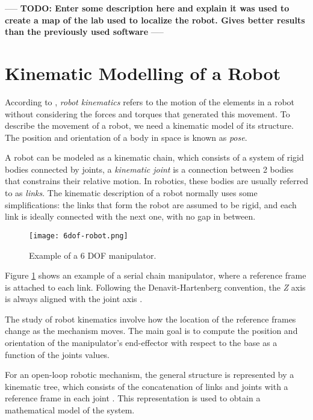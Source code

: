 ----- \textbf{TODO: Enter some description here and explain it was used to create a map of the lab used to localize the robot. Gives better results than the previously used software} -----

\section{Kinematic Modelling of a Robot}

According to \citet{Handbook}, \textit{robot kinematics} refers to the motion of the elements in a robot without considering the forces and torques that generated this movement. 
To describe the movement of a robot, we need a kinematic model of its structure. The position and orientation of a body  in space is known as \textit{pose}.

A robot can be modeled as a kinematic chain, which consists of a system of rigid bodies connected by joints, a \textit{kinematic joint} is a connection between 2 bodies that constrains their relative motion. In robotics, these bodies are usually referred to as \textit{links}.  The kinematic description of a robot normally uses some simplifications: the links that form the robot are assumed to be rigid, and each link is ideally connected with the next one, with no gap in between.
\begin{figure}[H]
	\centering
	\texttt{[image: 6dof-robot.png]}
	\vspace{-10pt}
	\caption{Example of a 6 DOF manipulator. \citep[chap. 1, page 24]{Handbook}}
	\vspace{-15pt}
	\label{fig:kinematic}
\end{figure}

Figure \ref{fig:kinematic} shows an example of a serial chain manipulator, where a reference frame is attached to each link. Following the Denavit-Hartenberg convention, the \textit{Z} axis is always aligned with the joint axis \citep{Craig}.

The study of robot kinematics involve how the location of the reference frames change as the mechanism moves. The main goal is to compute the position and orientation of the manipulator's end-effector with respect to the base as a function of the joints values.

For an open-loop robotic mechanism, the general structure is represented by a kinematic tree, which consists of the concatenation of links and joints with a reference frame in each joint \citep{Handbook}. This representation is used to obtain a mathematical model of the system. 

